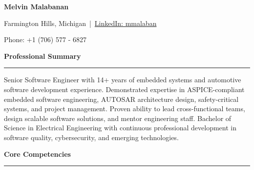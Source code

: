 \documentclass[11pt,letterpaper]{article}
\newcommand{\SectionHeading}[1]{%
  \vspace{0.3cm}
  {\large\bfseries\color{darkblue}#1}
  \vspace{0.1cm}
  \hrule
  \vspace{0.2cm}
}
\begin{document}

\begin{center}
  {\Large\bfseries Melvin Malabanan}

  \vspace{0.1cm}
  Farmington Hills, Michigan \,|\, \href{https://linkedin.com/in/mmalaban}{LinkedIn: mmalaban}

  \vspace{0.05cm}
  {\small Phone: +1 (706) 577 - 6827}
\end{center}

\vspace{0.2cm}


\SectionHeading{Professional Summary}

Senior Software Engineer with 14+ years of embedded systems and automotive software development experience. Demonstrated expertise in ASPICE-compliant embedded software engineering, AUTOSAR architecture design, safety-critical systems, and project management. Proven ability to lead cross-functional teams, design scalable software solutions, and mentor engineering staff. Bachelor of Science in Electrical Engineering with continuous professional development in software quality, cybersecurity, and emerging technologies.


\SectionHeading{Core Competencies}
\end{document}
